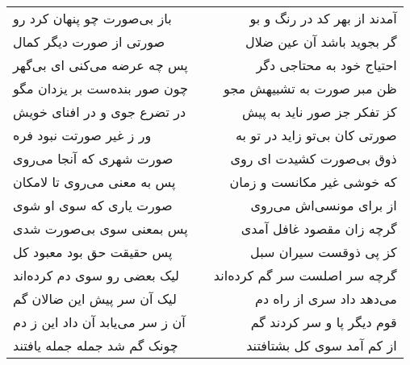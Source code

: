 \begin{center}
\begin{longtable}{l p{0.5cm} r}
باز بی‌صورت چو پنهان کرد رو
&&
آمدند از بهر کد در رنگ و بو
\\
صورتی از صورت دیگر کمال
&&
گر بجوید باشد آن عین ضلال
\\
پس چه عرضه می‌کنی ای بی‌گهر
&&
احتیاج خود به محتاجی دگر
\\
چون صور بنده‌ست بر یزدان مگو
&&
ظن مبر صورت به تشبیهش مجو
\\
در تضرع جوی و در افنای خویش
&&
کز تفکر جز صور ناید به پیش
\\
ور ز غیر صورتت نبود فره
&&
صورتی کان بی‌تو زاید در تو به
\\
صورت شهری که آنجا می‌روی
&&
ذوق بی‌صورت کشیدت ای روی
\\
پس به معنی می‌روی تا لامکان
&&
که خوشی غیر مکانست و زمان
\\
صورت یاری که سوی او شوی
&&
از برای مونسی‌اش می‌روی
\\
پس بمعنی سوی بی‌صورت شدی
&&
گرچه زان مقصود غافل آمدی
\\
پس حقیقت حق بود معبود کل
&&
کز پی ذوقست سیران سبل
\\
لیک بعضی رو سوی دم کرده‌اند
&&
گرچه سر اصلست سر گم کرده‌اند
\\
لیک آن سر پیش این ضالان گم
&&
می‌دهد داد سری از راه دم
\\
آن ز سر می‌یابد آن داد این ز دم
&&
قوم دیگر پا و سر کردند گم
\\
چونک گم شد جمله جمله یافتند
&&
از کم آمد سوی کل بشتافتند
\\
\end{longtable}
\end{center}
